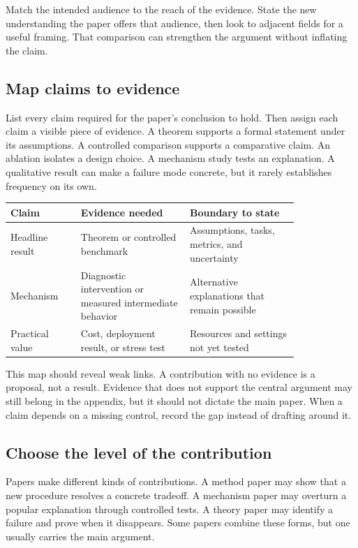 Match the intended audience to the reach of the evidence. State the new
understanding the paper offers that audience, then look to adjacent fields for
a useful framing. That comparison can strengthen the argument without
inflating the claim.

\subsection{Map claims to evidence}

List every claim required for the paper's conclusion to hold.
Then assign each claim a visible piece of evidence. A theorem supports a formal
statement under its assumptions. A controlled comparison supports a
comparative claim. An ablation isolates a design choice. A mechanism study
tests an explanation. A qualitative result can make a failure mode concrete,
but it rarely establishes frequency on its own.

\begin{center}
\begin{tabular}{p{0.20\linewidth}p{0.31\linewidth}p{0.31\linewidth}}
\toprule
\textbf{Claim} & \textbf{Evidence needed} & \textbf{Boundary to state} \\
\midrule
Headline result &
Theorem or controlled benchmark &
Assumptions, tasks, metrics, and uncertainty \\
\addlinespace
Mechanism &
Diagnostic intervention or measured intermediate behavior &
Alternative explanations that remain possible \\
\addlinespace
Practical value &
Cost, deployment result, or stress test &
Resources and settings not yet tested \\
\bottomrule
\end{tabular}
\end{center}

This map should reveal weak links. A contribution with no evidence is a
proposal, not a result. Evidence that does not support the central argument may
still belong in the appendix, but it should not dictate the main paper. When a
claim depends on a missing control, record the gap instead of drafting around
it.

\subsection{Choose the level of the contribution}

Papers make different kinds of contributions. A method paper may show that a
new procedure resolves a concrete tradeoff. A mechanism paper may overturn a
popular explanation through controlled tests. A theory paper may identify a
failure and prove when it disappears. Some papers combine these forms, but one
usually carries the main argument.

